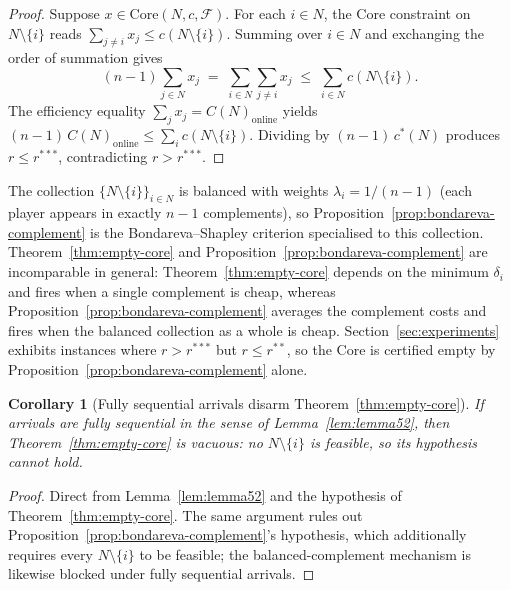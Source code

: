 \documentclass[11pt]{article}
\theoremstyle{plain}
\newtheorem{corollary}[theorem]{Corollary}
\theoremstyle{definition}
\theoremstyle{remark}
\newcommand{\F}{\mathcal{F}}
\newcommand{\cstar}{c^{\ast}}
\begin{document}
\begin{proof}
Suppose $x\in\mathrm{Core}(N,c,\F)$. For each $i\in N$, the Core constraint on $N\setminus\{i\}$ reads $\sum_{j\ne i} x_j \le c(N\setminus\{i\})$. Summing over $i\in N$ and exchanging the order of summation gives
\[
(n-1)\sum_{j\in N} x_j \;=\; \sum_{i\in N}\sum_{j\ne i} x_j \;\le\; \sum_{i\in N} c(N\setminus\{i\}).
\]
The efficiency equality $\sum_j x_j = C(N)_{\text{online}}$ yields $(n-1)\,C(N)_{\text{online}} \le \sum_i c(N\setminus\{i\})$. Dividing by $(n-1)\,\cstar(N)$ produces $r \le r^{\ast\ast\ast}$, contradicting $r>r^{\ast\ast\ast}$.
\end{proof}

The collection $\{N\setminus\{i\}\}_{i\in N}$ is balanced with weights $\lambda_i = 1/(n-1)$ (each player appears in exactly $n-1$ complements), so Proposition~\ref{prop:bondareva-complement} is the Bondareva--Shapley criterion \citep{shapley1971core} specialised to this collection. Theorem~\ref{thm:empty-core} and Proposition~\ref{prop:bondareva-complement} are incomparable in general: Theorem~\ref{thm:empty-core} depends on the minimum $\delta_i$ and fires when a single complement is cheap, whereas Proposition~\ref{prop:bondareva-complement} averages the complement costs and fires when the balanced collection as a whole is cheap. Section~\ref{sec:experiments} exhibits instances where $r > r^{\ast\ast\ast}$ but $r\le r^{\ast\ast}$, so the Core is certified empty by Proposition~\ref{prop:bondareva-complement} alone.

\begin{corollary}[Fully sequential arrivals disarm Theorem~\ref{thm:empty-core}]
\label{cor:cor51}
If arrivals are fully sequential in the sense of Lemma~\ref{lem:lemma52}, then Theorem~\ref{thm:empty-core} is vacuous: no $N\setminus\{i\}$ is feasible, so its hypothesis cannot hold.
\end{corollary}

\begin{proof}
Direct from Lemma~\ref{lem:lemma52} and the hypothesis of Theorem~\ref{thm:empty-core}. The same argument rules out Proposition~\ref{prop:bondareva-complement}'s hypothesis, which additionally requires every $N\setminus\{i\}$ to be feasible; the balanced-complement mechanism is likewise blocked under fully sequential arrivals.
\end{proof}
\end{document}
